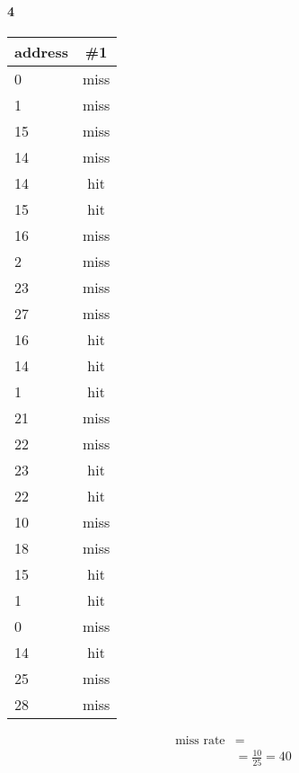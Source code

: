\documentclass[11pt]{article}
\begin{document}
\paragraph{4}
\begin{center}
	\begin{tabular}{l || c}
		address & \#1 \\
		\hline
		0  & miss \\
		1  & miss \\
		15 & miss \\
		14 & miss \\
		14 & hit  \\
		15 & hit  \\
		16 & miss \\
		2  & miss \\
		23 & miss \\
		27 & miss \\
		16 & hit  \\
		14 & hit  \\
		1  & hit  \\
		21 & miss \\
		22 & miss \\
		23 & hit  \\
		22 & hit  \\
		10 & miss \\
		18 & miss \\
		15 & hit \\
		1  & hit  \\
		0  & miss \\
		14 & hit \\
		25 & miss \\
		28 & miss \\
	\end{tabular}
	\begin{align*}
		\text{miss rate} &= \\
		&= \frac{10}{25} = 40%
	\end{align*}
\end{center}
\end{document}

